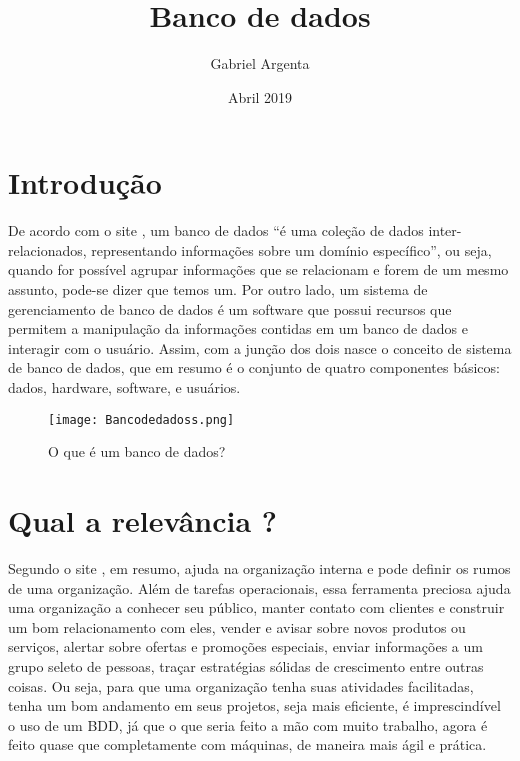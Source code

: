 \documentclass{article}
\title{Banco de dados}
\author{Gabriel Argenta}
\date{Abril 2019}
\begin{document}
\maketitle

\section{Introdução}
 De acordo com o site \cite{DEVMEDIA}, um banco de dados ``é uma coleção de dados inter-relacionados, representando informações sobre um domínio específico'', ou seja, quando for possível agrupar informações que se relacionam e forem de um mesmo assunto, pode-se dizer que temos um. Por outro lado, um sistema de gerenciamento de banco de dados é um software que possui recursos que permitem a manipulação da informações contidas em um banco de dados e interagir com o usuário. Assim, com a junção dos dois nasce o conceito de sistema de banco de dados, que em resumo é o conjunto de quatro componentes básicos: dados, hardware, software, e usuários.
\begin{figure}[htb]
    \centering
    \texttt{[image: Bancodedadoss.png]}
    \caption{O que é um banco de dados?}
    \label{fig:my_label}
\end{figure}

\section{Qual a relevância ?}
Segundo o site \cite{aprendaplsql}, em resumo, ajuda na organização interna e pode definir os rumos de uma organização. Além de tarefas operacionais, essa ferramenta preciosa ajuda uma organização a conhecer seu público, manter contato com clientes e construir um bom relacionamento com eles, vender e avisar sobre novos produtos ou serviços, alertar sobre ofertas e promoções especiais, enviar informações a um grupo seleto de pessoas, traçar estratégias sólidas de crescimento entre outras coisas. Ou seja, para que uma organização tenha suas atividades facilitadas, tenha um bom andamento em seus projetos, seja mais eficiente, é imprescindível o uso de um BDD, já que o que seria feito a mão com muito trabalho, agora é feito quase que completamente com máquinas, de maneira mais ágil e prática.
\end{document}

